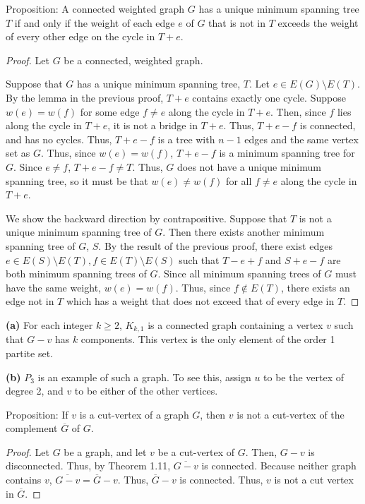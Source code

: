 \documentclass[12pt]{article}
\begin{document}
\newpage{} Proposition: A connected weighted graph $G$ has a unique minimum spanning tree $T$ if and only if the weight of each edge $e$ of $G$ that is not in $T$ exceeds the weight of every other edge on the cycle in $T+e$.
\begin{proof}
    Let $G$ be a connected, weighted graph.

    Suppose that $G$ has a unique minimum spanning tree, $T$.
    Let $e \in E(G) \setminus E(T)$.
    By the lemma in the previous proof, $T+e$ contains exactly one cycle.
    Suppose $w(e) = w(f)$ for some edge $f \neq e$ along the cycle in $T+e$.
    Then, since $f$ lies along the cycle in $T+e$, it is not a bridge in $T+e$. %
    Thus, $T+e-f$ is connected, and has no cycles.
    Thus, $T+e-f$ is a tree with $n-1$ edges and the same vertex set as $G$.
    Thus, since $w(e) = w(f)$, $T+e-f$ is a minimum spanning tree for $G$.
    Since $e \neq f$, $T+e-f \neq T$.
    Thus, $G$ does not have a unique minimum spanning tree, so it must be that $w(e) \neq w(f)$ for all $f \neq e$ along the cycle in $T+e$.

    We show the backward direction by contrapositive.
    Suppose that $T$ is not a unique minimum spanning tree of $G$.
    Then there exists another minimum spanning tree of $G$, $S$.
    By the result of the previous proof, there exist edges $e \in E(S) \setminus E(T), f \in E(T) \setminus E(S)$ such that $T - e + f$ and $S + e - f$ are both minimum spanning trees of $G$.
    Since all minimum spanning trees of $G$ must have the same weight, $w(e) = w(f)$.
    Thus, since $f \not\in E(T)$, there exists an edge not in $T$ which has a weight that does not exceed that of every edge in $T$.
\end{proof}

\newpage{}

    {\bf (a)} For each integer $k \geq 2$, $K_{k,1}$ is a connected graph containing a vertex $v$ such that $G-v$ has $k$ components.
    This vertex is the only element of the order 1 partite set.

    {\bf (b)} $P_3$ is an example of such a graph.
    To see this, assign $u$ to be the vertex of degree 2, and $v$ to be either of the other vertices.

\newpage{} Proposition: If $v$ is a cut-vertex of a graph $G$, then $v$ is not a cut-vertex of the complement $\overline{G}$ of $G$.

\begin{proof}
    Let $G$ be a graph, and let $v$ be a cut-vertex of $G$.
    Then, $G-v$ is disconnected.
    Thus, by Theorem 1.11, $\overline{G-v}$ is connected.
    Because neither graph contains $v$, $\overline{G-v} = \overline G - v$.
    Thus, $\overline G - v$ is connected.
    Thus, $v$ is not a cut vertex in $\overline G$.
\end{proof}
\end{document}
